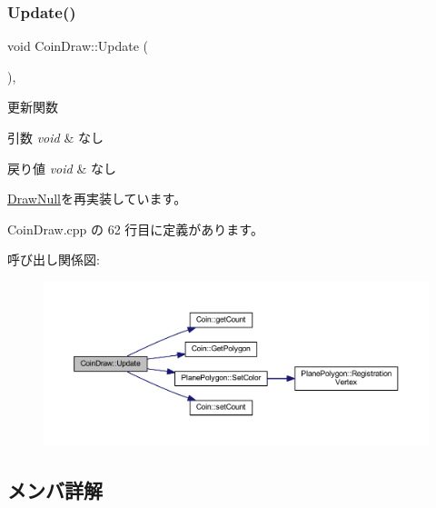 \subsubsection{\texorpdfstring{Update()}{Update()}}
{\footnotesize\ttfamily void Coin\+Draw\+::\+Update (\begin{DoxyParamCaption}{ }\end{DoxyParamCaption})\hspace{0.3cm}{\ttfamily [override]}, {\ttfamily [virtual]}}



更新関数 


\begin{DoxyParams}{引数}
{\em void} & なし \\
\hline
\end{DoxyParams}

\begin{DoxyRetVals}{戻り値}
{\em void} & なし \\
\hline
\end{DoxyRetVals}


\mbox{\hyperlink{class_draw_null_a0149bcf84a34b138642ab7975ae46f30}{Draw\+Null}}を再実装しています。



 Coin\+Draw.\+cpp の 62 行目に定義があります。

呼び出し関係図\+:\nopagebreak
\begin{figure}[H]
\begin{center}
\leavevmode
\includegraphics[width=350pt]{class_coin_draw_a6157b17bf1706b85156aad0d88acfd7e_cgraph}
\end{center}
\end{figure}


\subsection{メンバ詳解}
\mbox{\label{class_coin_draw_a62baab6b1a22df45ce4c81970f4a38f4}} 
